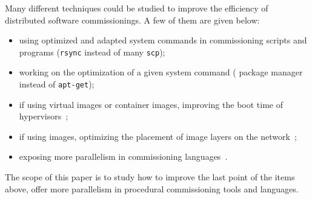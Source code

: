 Many different techniques could be studied to improve the efficiency
of distributed software commissionings. A few of them are given below:
\begin{itemize}
\item using optimized and adapted system commands in commissioning
  scripts and programs (\eg \texttt{rsync} instead of many
  \texttt{scp});
\item working on the optimization of a given system command (\eg
  \nix package manager instead of \texttt{apt-get});
\item if using virtual images or container images, improving the
  boot time of hypervisors~\cite{nguyen:hal-02172288};
\item if using \docker images, optimizing the placement of image
  layers on the network~\cite{darrous:hal-01745405};
\item exposing more parallelism in commissioning
  languages~\cite{dicosmo:hal-01233489}.
\end{itemize}

\begin{tcolorbox}[enhanced,attach boxed title to top left={yshift=-3mm,yshifttext=-1mm},
  colback=black!5!white,colframe=black!30,colbacktitle=black!60,
  title=Scope,fonttitle=\bfseries,
  boxed title style={size=small,colframe=black!60,boxrule=0.2mm},
  boxrule=0.2mm]
  The scope of this paper is to study how to improve the last point of
  the items above, \ie offer more parallelism in procedural
  commissioning tools and languages.
\end{tcolorbox}
